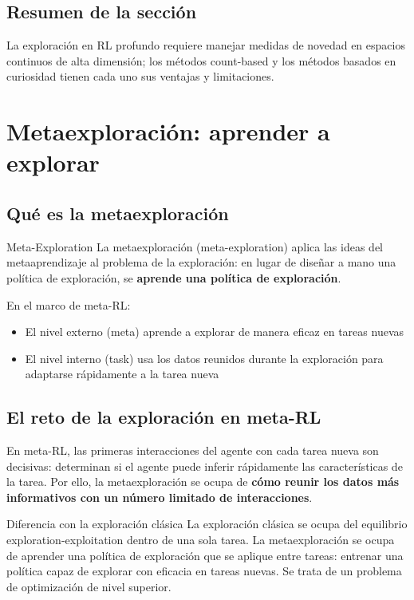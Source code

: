 \documentclass[a4paper]{article}
\begin{document}
\subsection{Resumen de la sección}

La exploración en RL profundo requiere manejar medidas de novedad en espacios continuos de alta dimensión; los métodos count-based y los métodos basados en curiosidad tienen cada uno sus ventajas y limitaciones.
\section{Metaexploración: aprender a explorar}

\subsection{Qué es la metaexploración}

\begin{importantbox}{Meta-Exploration}
La metaexploración (meta-exploration) aplica las ideas del metaaprendizaje al problema de la exploración: en lugar de diseñar a mano una política de exploración, se \textbf{aprende una política de exploración}.

En el marco de meta-RL:
\begin{itemize}
    \item El nivel externo (meta) aprende a explorar de manera eficaz en tareas nuevas
    \item El nivel interno (task) usa los datos reunidos durante la exploración para adaptarse rápidamente a la tarea nueva
\end{itemize}
\end{importantbox}

\subsection{El reto de la exploración en meta-RL}

En meta-RL, las primeras interacciones del agente con cada tarea nueva son decisivas: determinan si el agente puede inferir rápidamente las características de la tarea. Por ello, la metaexploración se ocupa de \textbf{cómo reunir los datos más informativos con un número limitado de interacciones}.

\begin{knowledgebox}{Diferencia con la exploración clásica}
La exploración clásica se ocupa del equilibrio exploration-exploitation dentro de una sola tarea. La metaexploración se ocupa de aprender una política de exploración que se aplique entre tareas: entrenar una política capaz de explorar con eficacia en tareas nuevas. Se trata de un problema de optimización de nivel superior.
\end{knowledgebox}
\end{document}
